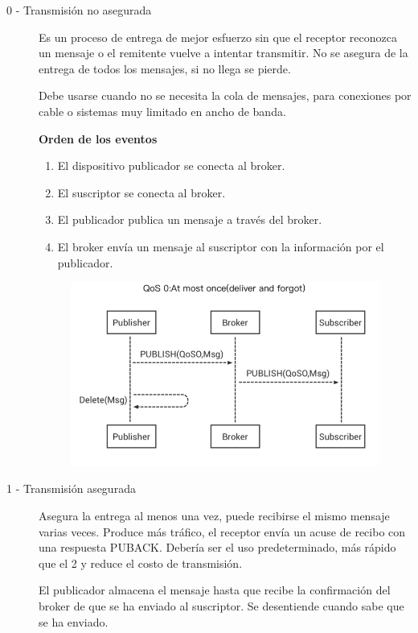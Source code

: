 \documentclass[12pt, twoside, openright]{report} %
\begin{document}
\begin{description}
	\item[0 - Transmisión no asegurada] Es un proceso de entrega de mejor esfuerzo sin que el receptor reconozca un mensaje o el remitente vuelve a intentar transmitir. No se asegura de la entrega de todos los mensajes, si no llega se pierde.

	      Debe usarse cuando no se necesita la cola de mensajes, para conexiones por cable o sistemas muy limitado en ancho de banda.

	      \textbf{Orden de los eventos}
	      \begin{enumerate}
		      \item El dispositivo publicador se conecta al broker.
		      \item El suscriptor se conecta al broker.
		      \item El publicador publica un mensaje a través del broker.
		      \item El broker envía un mensaje al suscriptor con la información por el publicador.
	      \end{enumerate}

	      \begin{figure}[H]
		      {\includegraphics[scale=.5]{0_1NSybQWdhHvVhnTb.png}}
	      \end{figure}
	\item[1 - Transmisión asegurada] Asegura la entrega al menos una vez, puede recibirse el mismo mensaje varias veces. Produce más tráfico, el receptor envía un acuse de recibo con una respuesta PUBACK. Debería ser el uso predeterminado, más rápido que el 2 y reduce el costo de transmisión.

	      El publicador almacena el mensaje hasta que recibe la confirmación del broker de que se ha enviado al suscriptor. Se desentiende cuando sabe que se ha enviado.


\end{description}
\end{document}
